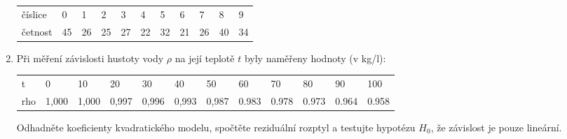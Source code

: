 \documentclass[a4paper,12pt]{article}
\begin{document}
\begin{enumerate}
    \begin{center}
    \begin{tabular}{lllllllllll}
    číslice &0 &1 &2 &3 &4 &5 &6 &7 &8 &9\\
    četnost &45 &26 &25 &27 &22 &32 &21 &26 &40 &34 
    \end{tabular}
    \end{center}


\item
      Při měření závislosti hustoty vody $\rho$ na její teplotě $t$ byly naměřeny hodnoty (v kg/l):
\begin{center}
      \begin{tabular}{llllllllllll}
       t & 0 & 10 & 20 & 30 & 40 & 50 & 60 & 70 & 80 & 90 & 100 \\
       rho & 1,000 & 1,000 & 0,997 & 0,996 & 0,993 & 0,987 & 0.983 & 0.978 & 0.973 & 0.964 & 0.958
      \end{tabular}
\end{center}
      Odhadněte koeficienty kvadratického modelu, spočtěte reziduální rozptyl a testujte hypotézu $H_0$, že závislost je pouze lineární. 


      

\end{enumerate}
\end{document}
